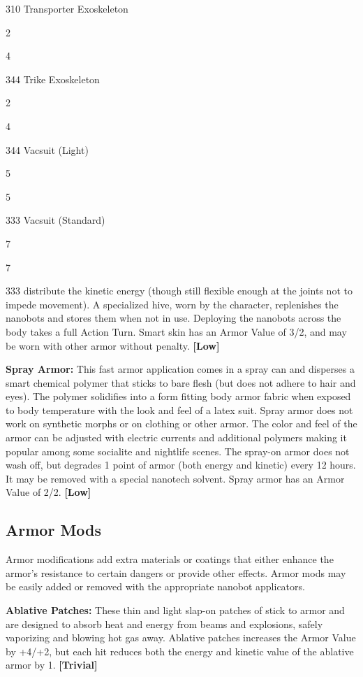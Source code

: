 310
Transporter Exoskeleton 

2

4

344
Trike Exoskeleton 

2

4

344
Vacsuit (Light)  

5

5

333
Vacsuit (Standard)  

7

7

333
distribute the kinetic energy (though still flexible 
enough at the joints not to impede movement). A specialized
hive, worn by the character, replenishes the
nanobots and stores them when not in use. Deploying 
the nanobots across the body takes a full Action Turn. 
Smart skin has an Armor Value of 3/2, and may be 
worn with other armor without penalty. \textbf{[Low]}

\textbf{Spray Armor:} This fast armor application comes in 
a spray can and disperses a smart chemical polymer 
that sticks to bare flesh (but does not adhere to hair 
and eyes). The polymer solidifies into a form fitting 
body armor fabric when exposed to body temperature 
with the look and feel of a latex suit. Spray armor 
does not work on synthetic morphs or on clothing or 
other armor. The color and feel of the armor can be 
adjusted with electric currents and additional polymers
making it popular among some socialite and
nightlife scenes. The spray-on armor does not wash 
off, but degrades 1 point of armor (both energy and 
kinetic) every 12 hours. It may be removed with a 
special nanotech solvent. Spray armor has an Armor 
Value of 2/2. \textbf{[Low]}

\subsection{Armor Mods}

Armor modifications add extra materials or coatings 
that either enhance the armor's resistance to certain 
dangers or provide other effects. Armor mods may be 
easily added or removed with the appropriate nanobot
applicators.

\textbf{Ablative Patches:} These thin and light slap-on 
patches of stick to armor and are designed to absorb 
heat and energy from beams and explosions, safely 
vaporizing and blowing hot gas away. Ablative 
patches increases the Armor Value by +4/+2, but each 
hit reduces both the energy and kinetic value of the 
ablative armor by 1. \textbf{[Trivial]}

